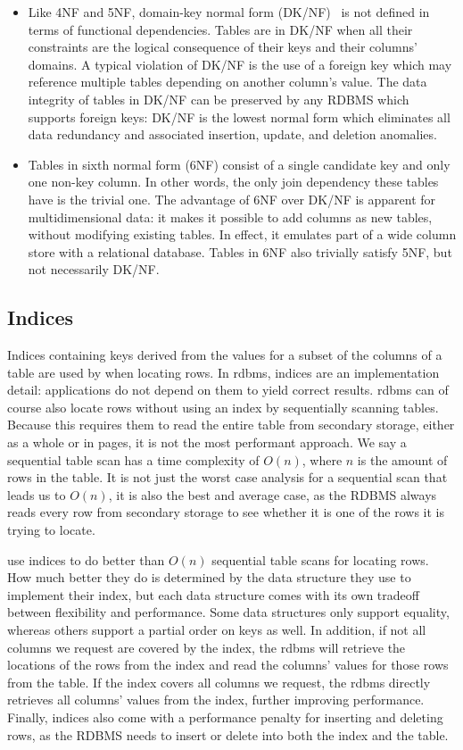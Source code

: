 \begin{itemize}
\item Like 4NF and 5NF, domain-key normal form (DK/NF)~\citep{DBLP:journals/tods/Fagin81} is not defined in terms of functional dependencies. Tables are in DK/NF when all their constraints are the logical consequence of their keys and their columns' domains. A typical violation of DK/NF is the use of a foreign key which may reference multiple tables depending on another column's value. The data integrity of tables in DK/NF can be preserved by any RDBMS which supports foreign keys\thinspace: DK/NF is the lowest normal form which eliminates all data redundancy and associated insertion, update, and deletion anomalies.
\item Tables in sixth normal form (6NF) consist of a single candidate key and only one non-key column. In other words, the only join dependency these tables have is the trivial one. The advantage of 6NF over DK/NF is apparent for multidimensional data: it makes it possible to add columns as new tables, without modifying existing tables. In effect, it emulates part of a wide column store with a relational database. Tables in 6NF also trivially satisfy 5NF, but not necessarily DK/NF.
\end{itemize}

\subsection{Indices}%

Indices containing keys derived from the values for a subset of the columns of a table are used by  when locating rows.
In \acrshort{rdbms}, indices are an implementation detail\thinspace: applications do not depend on them to yield correct results.
\Acrshort{rdbms} can of course also locate rows without using an index by sequentially scanning tables.
Because this requires them to read the entire table from secondary storage, either as a whole or in pages, it is not the most performant approach.
We say a sequential table scan has a time complexity of \(O(n)\), where \(n\) is the amount of rows in the table.
It is not just the worst case analysis for a sequential scan that leads us to \(O(n)\), it is also the best and average case, as the RDBMS always reads every row from secondary storage to see whether it is one of the rows it is trying to locate.

 use indices to do better than \(O(n)\) sequential table scans for locating rows.
How much better they do is determined by the data structure they use to implement their index, but each data structure comes with its own tradeoff between flexibility and performance.
Some data structures only support equality, whereas others support a partial order on keys as well.
In addition, if not all columns we request are covered by the index, the \acrshort{rdbms} will retrieve the locations of the rows from the index and read the columns' values for those rows from the table.
If the index covers all columns we request, the \acrshort{rdbms} directly retrieves all columns' values from the index, further improving performance.
Finally, indices also come with a performance penalty for inserting and deleting rows, as the RDBMS needs to insert or delete into both the index and the table.

